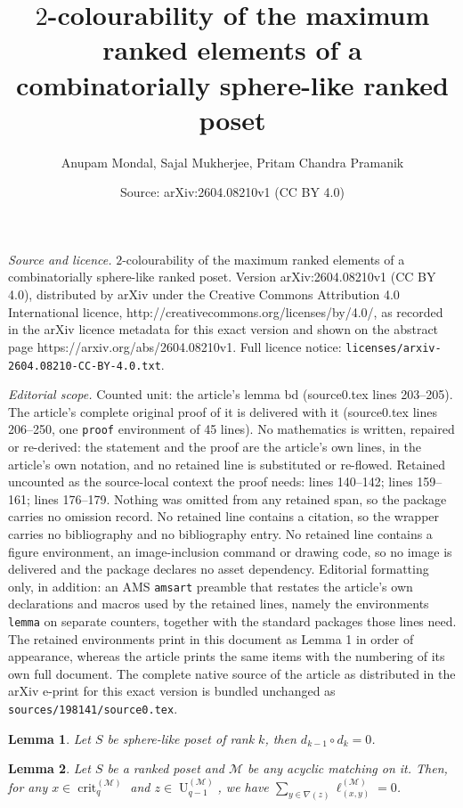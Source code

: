 \documentclass[10pt,a4paper]{amsart}
\title{$2$-colourability of the maximum ranked elements of a combinatorially sphere-like ranked poset}
\author{Anupam Mondal, Sajal Mukherjee, Pritam Chandra Pramanik}
\date{Source: arXiv:2604.08210v1 (CC BY 4.0)}
\newtheorem{lemma}{Lemma}
\newcommand{\M}{\mathcal{M}}
\newcommand{\crit}{\operatorname{crit}}
\newcommand{\up}{\operatorname{U}}
\begin{document}
\maketitle

\noindent\emph{Source and licence.} $2$-colourability of the maximum ranked elements of a combinatorially sphere-like ranked poset. Version arXiv:2604.08210v1 (CC BY 4.0), distributed by arXiv under the Creative Commons Attribution 4.0 International licence, http://creativecommons.org/licenses/by/4.0/, as recorded in the arXiv licence metadata for this exact version and shown on the abstract page https://arxiv.org/abs/2604.08210v1. Full licence notice: \texttt{licenses/arxiv-2604.08210-CC-BY-4.0.txt}.\par\smallskip

\noindent\textit{Editorial scope.} Counted unit: the article's lemma bd (source0.tex lines 203--205). The article's complete original proof of it is delivered with it (source0.tex lines 206--250, one \texttt{proof} environment of 45 lines). No mathematics is written, repaired or re-derived: the statement and the proof are the article's own lines, in the article's own notation, and no retained line is substituted or re-flowed.  Retained uncounted as the source-local context the proof needs: lines 140--142; lines 159--161; lines 176--179.  Nothing was omitted from any retained span, so the package carries no omission record.  No retained line contains a citation, so the wrapper carries no bibliography and no bibliography entry.  No retained line contains a figure environment, an image-inclusion command or drawing code, so no image is delivered and the package declares no asset dependency.  Editorial formatting only, in addition: an AMS \texttt{amsart} preamble that restates the article's own declarations and macros used by the retained lines, namely the environments \texttt{lemma} on separate counters, together with the standard packages those lines need.  The retained environments print in this document as Lemma 1 in order of appearance, whereas the article prints the same items with the numbering of its own full document.  The complete native source of the article as distributed in the arXiv e-print for this exact version is bundled unchanged as \texttt{sources/198141/source0.tex}.
	\begin{lemma}\label{poincare}
		Let  $S$ be sphere-like poset of rank $k$, then $d_{k-1}\circ d_{k}=0$.
	\end{lemma}

	 \begin{lemma}\label{ft}
	 	Let $S$ be a ranked poset and $\M$ be any acyclic matching on it. Then, for any $x\in \crit_q^{(\M)}$ and $z\in \up_{q-1}^{(\M)}$, we have  $\sum_{y\in \nabla(z)} \ell^{(\M)}_{(x,y)}=0$.
	 \end{lemma}
\end{document}
